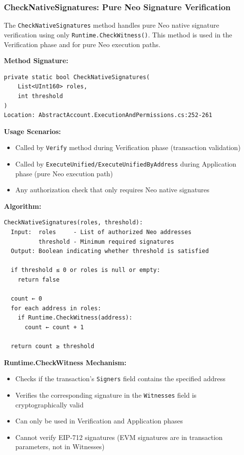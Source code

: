 \documentclass[10pt,twocolumn]{article}
\newcommand{\code}[1]{\texttt{\small #1}}
\begin{document}
{\subsubsection{CheckNativeSignatures: Pure Neo Signature Verification}

The \code{CheckNativeSignatures} method handles pure Neo native signature verification using only \code{Runtime.CheckWitness()}. This method is used in the Verification phase and for pure Neo execution paths.

\textbf{Method Signature:}
\begin{small}
\begin{verbatim}
private static bool CheckNativeSignatures(
    List<UInt160> roles, 
    int threshold
)
Location: AbstractAccount.ExecutionAndPermissions.cs:252-261
\end{verbatim}
\end{small}

\textbf{Usage Scenarios:}

\begin{itemize}[leftmargin=*,topsep=2pt,itemsep=1pt]
\item Called by \code{Verify} method during Verification phase (transaction validation)
\item Called by \code{ExecuteUnified/ExecuteUnifiedByAddress} during Application phase (pure Neo execution path)
\item Any authorization check that only requires Neo native signatures
\end{itemize}

\textbf{Algorithm:}

\begin{small}
\begin{verbatim}
CheckNativeSignatures(roles, threshold):
  Input:  roles     - List of authorized Neo addresses
          threshold - Minimum required signatures
  Output: Boolean indicating whether threshold is satisfied
  
  if threshold ≤ 0 or roles is null or empty:
    return false
  
  count ← 0
  for each address in roles:
    if Runtime.CheckWitness(address):
      count ← count + 1
  
  return count ≥ threshold
\end{verbatim}
\end{small}

\textbf{Runtime.CheckWitness Mechanism:}

\begin{itemize}[leftmargin=*,topsep=2pt,itemsep=1pt]
\item Checks if the transaction's \code{Signers} field contains the specified address
\item Verifies the corresponding signature in the \code{Witnesses} field is cryptographically valid
\item Can only be used in Verification and Application phases
\item Cannot verify EIP-712 signatures (EVM signatures are in transaction parameters, not in Witnesses)
\end{itemize}

}
\end{document}
